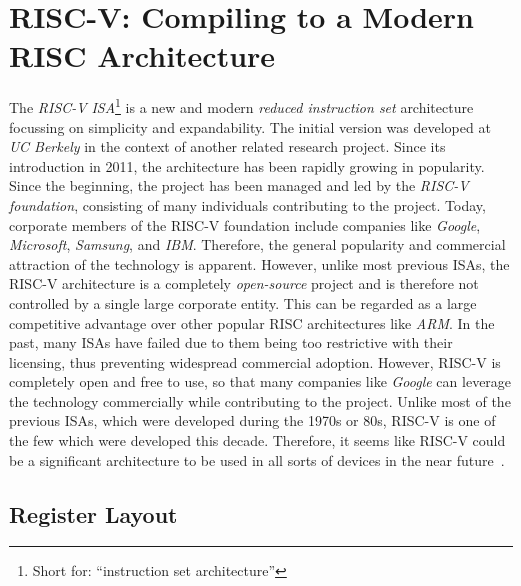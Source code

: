 \newpage

\section{RISC-V: Compiling to a Modern RISC Architecture}

The \emph{RISC-V} \emph{ISA}\footnote{Short for: \enquote{instruction set architecture}} is a new and modern \emph{reduced instruction set} architecture focussing on simplicity and expandability.
The initial version was developed at \emph{UC Berkely} in the context of another related research project.
Since its introduction in 2011, the architecture has been rapidly growing in popularity.
Since the beginning, the project has been managed and led by the \emph{RISC-V foundation}, consisting of many individuals contributing to the project.
Today, corporate members of the RISC-V foundation include companies like \emph{Google}, \emph{Microsoft}, \emph{Samsung}, and \emph{IBM}.
Therefore, the general popularity and commercial attraction of the technology is apparent.
However, unlike most previous ISAs, the RISC-V architecture is a completely \emph{open-source} project and is therefore not controlled by a single large corporate entity.
This can be regarded as a large competitive advantage over other popular RISC architectures like \emph{ARM}.
In the past, many ISAs have failed due to them being too restrictive with their licensing, thus preventing widespread commercial adoption.
However, RISC-V is completely open and free to use, so that many companies like \emph{Google} can leverage the technology commercially while contributing to the project.
Unlike most of the previous ISAs, which were developed during the 1970s or 80s, RISC-V is one of the few which were developed this decade.
Therefore, it seems like RISC-V could be a significant architecture to be used in all sorts of devices in the near future~\cite[preface]{Patterson2017}.

\subsection{Register Layout}

